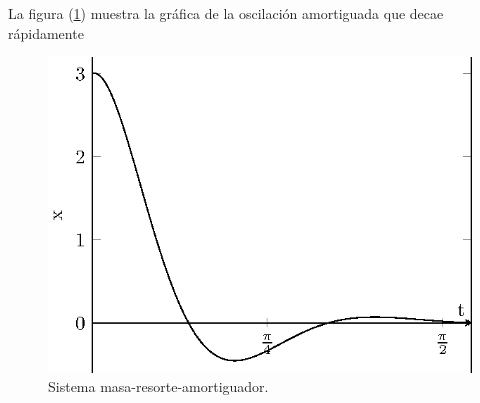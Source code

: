 \begin{ejemplo}
La figura (\ref{fig:figura_009}) muestra la gráfica de la oscilación amortiguada que decae rápidamente
\begin{figure}[H]
    \centering
    \includegraphics[scale=1.3]{Imagenes/sist_masa_resorte_dump_plot_02.eps}
    \caption{Sistema masa-resorte-amortiguador.}
    \label{fig:figura_009}
    \end{figure}
\end{ejemplo}
